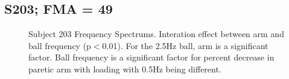 \documentclass{article}
\begin{document}
\clearpage
\subsection{S203; FMA = 49}

\begin{figure}[!ht]
     \centering
     \hfill
     \hfill
	\caption{Subject 203 Frequency Spectrums. Interation effect between arm and ball frequency (p$<$0.01). For the 2.5Hz ball, arm is a significant factor. Ball frequency is a significant factor for percent decrease in paretic arm with loading  with 0.5Hz being different.}
\end{figure}
\end{document}
